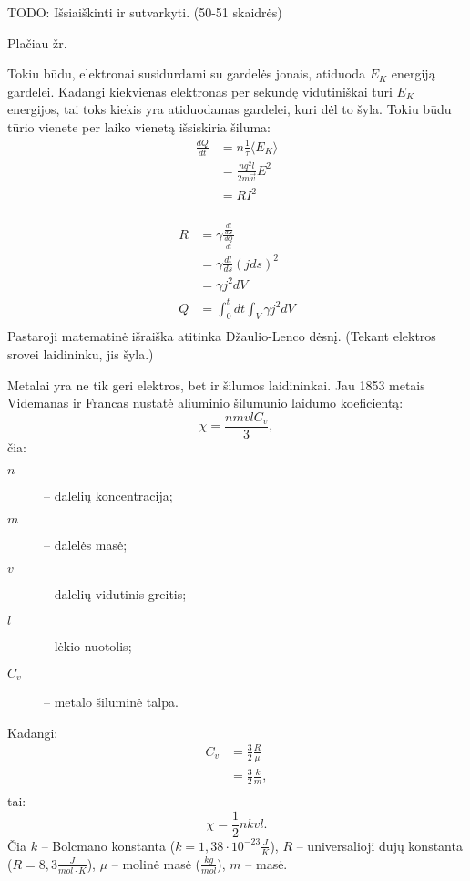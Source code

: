 TODO: Išsiaiškinti ir sutvarkyti. (50-51 skaidrės)

Plačiau žr. \cite[54p.]{elektra-magnetizmas}

Tokiu būdu, elektronai susidurdami su gardelės jonais, atiduoda
$E_{K}$ energiją gardelei. Kadangi kiekvienas elektronas per sekundę
vidutiniškai turi $E_{K}$ energijos, tai toks kiekis yra atiduodamas
gardelei, kuri dėl to šyla. Tokiu būdu tūrio vienete per laiko
vienetą išsiskiria šiluma:
\begin{align*}
  \frac{dQ}{dt}
  &= n \frac{1}{\tau}\langle E_{K} \rangle \\
  &= \frac{n q^{2} l}{2 m \vec{v}} E^{2} \\
  &= R I^{2} \\
\end{align*}

\begin{align*}
  R
  &= \gamma \frac{\frac{dl}{dS}}{\frac{dQ}{dt}} \\
  &= \gamma \frac{dl}{ds}\left( jds \right)^{2} \\
  &= \gamma j^{2} dV \\
  Q
  &= \int _{0} ^{t} dt \int _{V} \gamma j^{2} dV \\
\end{align*}
Pastaroji matematinė išraiška atitinka Džaulio-Lenco dėsnį.
(Tekant elektros srovei laidininku, jis šyla.)

Metalai yra ne tik geri elektros, bet ir šilumos laidininkai. Jau
1853 metais Videmanas ir Francas nustatė aliuminio šilumunio
laidumo koeficientą:
\begin{equation*}
  \chi = \frac{nmvlC_{v}}{3},
\end{equation*}
čia:
\begin{description}
  \item[$n$] – dalelių koncentracija;
  \item[$m$] – dalelės masė;
  \item[$v$] – dalelių vidutinis greitis;
  \item[$l$] – lėkio nuotolis;
  \item[$C_{v}$] – metalo šiluminė talpa.
\end{description}
Kadangi:
\begin{align*}
  C_{v}
  &= \frac{3}{2}\frac{R}{\mu} \\
  &= \frac{3}{2}\frac{k}{m}, \\
\end{align*}
tai:
\begin{equation*}
  \chi = \frac{1}{2} nkvl.
\end{equation*}
Čia $k$ – Bolcmano konstanta ($k = 1,38\cdot 10^{-23}\frac{J}{K}$),
$R$ – universalioji dujų konstanta ($R = 8,3\frac{J}{mol \cdot K}$),
$\mu$ – molinė masė ($\frac{kg}{mol}$), $m$ – masė.

